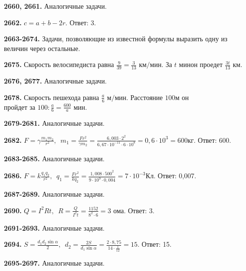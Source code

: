\textbf{2660, 2661.} Аналогичные задачи.

\textbf{2662.} $c = a + b - 2r.$\null \hspace*{\fill} Ответ: 3. 

\textbf{2663-2674.} Задачи, позволяющие из известной формулы выразить одну из величин через остальные.

\textbf{2675.} $\text{Скорость велосипедиста равна }\frac{9}{39}=\frac{3}{13}\text{ км/мин}. \text{ За } t \text{ мин}$\newline$\text{он проедет }\frac{3t}{13}\text{ км.}$

\textbf{2676, 2677.} Аналогичные задачи.

\textbf{2678.} $\text{Скорость пешехода равна }\frac{a}{6}\text{ м/мин. Расстояние 100м он}$\newline$\text{пройдет за } 100 : \frac{a}{6}=\frac{600}{a}\text{ мин.}$

\textbf{2679-2681.} Аналогичные задачи.

\textbf{2682.} $F = \gamma\frac{m_1m_2}{r^2},\enspace m_1=\frac{Fr^2}{\gamma m_2}=\frac{6,003\cdot 2^2}{6,67 \cdot 10^{-11} \cdot 6 \cdot 10^8}= 0,6\cdot 10^3 = 600\text{кг}.$\newline \null \hspace*{\fill} Ответ: 600. 

\textbf{2683-2685.} Аналогичные задачи.

\textbf{2686.} $F = k\frac{q_1q_2}{r^2},\enspace q_1=\frac{Fr^2}{kq_2}=\frac{1,008\cdot 500^2}{9\cdot 10^9\cdot 0,004}=7\cdot 10^{-3}\text{Кл}.$ \newline \null \hspace*{\fill} Ответ: 0,007. 

\textbf{2687-2689.} Аналогичные задачи.

\textbf{2690.} $Q = I^2Rt,\enspace R=\frac{Q}{I^2t}=\frac{1152}{8^2\cdot 6}= 3 \text{ ома}.$ \newline \null \hspace*{\fill} Ответ: 3. 

\textbf{2691-2693.} Аналогичные задачи.

\textbf{2694.} $S=\frac{d_1d_2\sin\alpha}{2},\enspace d_2=\frac{2S}{d_1\sin\alpha}=\frac{2\cdot 8,75}{14\cdot \frac{1}{12}}=15.$ \newline \null \hspace*{\fill} Ответ: 15. 

\textbf{2695-2697.} Аналогичные задачи.

